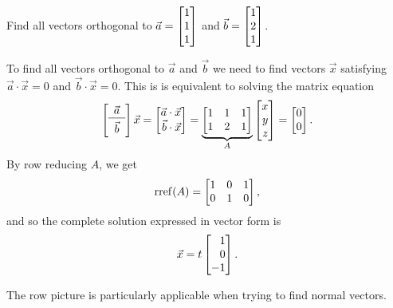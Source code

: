 \begin{example}
	Find all vectors orthogonal to $\vec a=\mat{1\\1\\1}$ and $\vec b=\mat{1\\2\\1}$.

	To find all vectors orthogonal to $\vec a$ and $\vec b$ we need to find vectors $\vec x$
	satisfying $\vec a\cdot \vec x=0$ and $\vec b\cdot \vec x=0$. This is is equivalent to solving the matrix equation
	\[
		\left[\begin{array}{c}\vec a\\\hline\\[-1.5\medskipamount]\vec b\end{array}\right]\vec x
	=\mat{\vec a\cdot \vec x\\\vec b\cdot\vec x}
	=\underbrace{\mat{1&1&1\\1&2&1}}_A\mat{x\\y\\z}
	=\mat{0\\0}.
    \]
    By row reducing $A$, we get
    \[
        \Rref(A) = \mat{1&0&1\\0&1&0},
    \]
    and so the complete solution expressed in vector form is
    \[
        \vec x = t\mat{1\\0\\-1}.
	\]
\end{example}

The row picture is particularly applicable when trying to find normal vectors.

